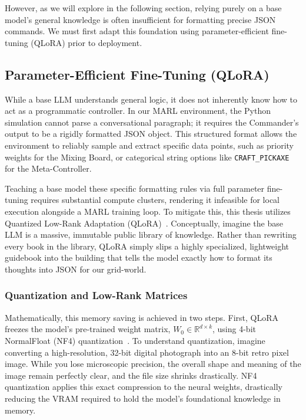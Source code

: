 However, as we will explore in the following section, relying purely on a base model's general knowledge is often insufficient for formatting precise JSON commands. We must first adapt this foundation using parameter-efficient fine-tuning (QLoRA) prior to deployment.

\subsection{Parameter-Efficient Fine-Tuning (QLoRA)}
\label{sec:qlora}

While a base LLM understands general logic, it does not inherently know how to act as a programmatic controller. In our MARL environment, the Python simulation cannot parse a conversational paragraph; it requires the Commander's output to be a rigidly formatted JSON object. This structured format allows the environment to reliably sample and extract specific data points, such as priority weights for the Mixing Board, or categorical string options like \texttt{CRAFT\_PICKAXE} for the Meta-Controller. 

Teaching a base model these specific formatting rules via full parameter fine-tuning requires substantial compute clusters, rendering it infeasible for local execution alongside a MARL training loop. To mitigate this, this thesis utilizes Quantized Low-Rank Adaptation (QLoRA)~\parencite{Dettmers_Pagnoni_Holtzman_Zettlemoyer_2023}. Conceptually, imagine the base LLM is a massive, immutable public library of knowledge. Rather than rewriting every book in the library, QLoRA simply slips a highly specialized, lightweight guidebook into the building that tells the model exactly how to format its thoughts into JSON for our grid-world.

\subsubsection{Quantization and Low-Rank Matrices}

Mathematically, this memory saving is achieved in two steps. First, QLoRA freezes the model's pre-trained weight matrix, $W_0 \in \mathbb{R}^{d \times k}$, using 4-bit NormalFloat (NF4) quantization~\parencite{Dettmers_Pagnoni_Holtzman_Zettlemoyer_2023, Hu_Shen_Wallis_Allen-Zhu_Li_Wang_Wang_Chen_2021}. To understand quantization, imagine converting a high-resolution, 32-bit digital photograph into an 8-bit retro pixel image. While you lose microscopic precision, the overall shape and meaning of the image remain perfectly clear, and the file size shrinks drastically. NF4 quantization applies this exact compression to the neural weights, drastically reducing the VRAM required to hold the model's foundational knowledge in memory.


